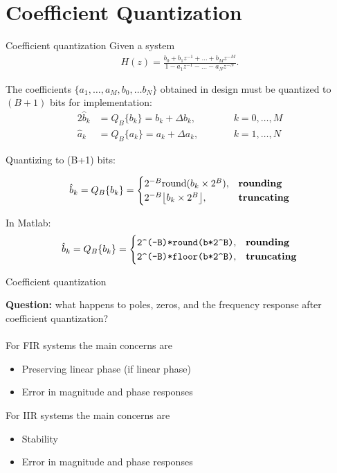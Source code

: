 \documentclass[10pt, aspectratio=169, handout]{beamer}
\begin{document}
%
\section{Coefficient Quantization}
\begin{frame}{Coefficient quantization}
	Given a system
	\begin{align*}
		H(z) = \frac{b_0 + b_1z^{-1} + \ldots + b_Mz^{-M}}{1 - a_1z^{-1} - \ldots - a_Nz^{-N}}.
	\end{align*}
	
	The coefficients $\{a_1, \ldots, a_M, b_0,\ldots b_N\}$ obtained in design must  be quantized to $(B+1)$ bits for implementation:
	\begin{alignat*}{2}
		\hat{b}_k &= Q_B\{b_k\} = b_k + \Delta b_k, \qquad &&  k = 0, \ldots, M \\
		\hat{a}_k &= Q_B\{a_k\} = a_k + \Delta a_k, \qquad && k = 1, \ldots, N
	\end{alignat*}
	
	\pause
	\vspace{0.25cm}
	Quantizing to (B+1) bits:
	
	\begin{equation*}
	\hat{b}_k = Q_B\{b_k\} = \begin{cases}
	2^{-B}\mathrm{round}(b_k\times 2^B), & \text{\textbf{rounding}} \\
	2^{-B}\big\lfloor b_k\times 2^B\big\rfloor, & \text{\textbf{truncating}}
	\end{cases}
	\end{equation*}
	
	In Matlab:
	\begin{equation*}
	\hat{b}_k = Q_B\{b_k\} = \begin{cases}
	\texttt{2\textasciicircum(-B)*round(b*2\textasciicircum B)}, & \text{\textbf{rounding}} \\
	\texttt{2\textasciicircum(-B)*floor(b*2\textasciicircum B)}, & \text{\textbf{truncating}}
	\end{cases}
	\end{equation*}
\end{frame}

\begin{frame}{Coefficient quantization}

\textbf{Question:} what happens to poles, zeros, and the frequency response after coefficient quantization?
~\\
~\\

For FIR systems the main concerns are
\begin{itemize}
	\item Preserving linear phase (if linear phase)
	\item Error in magnitude and phase responses
\end{itemize}

For IIR systems the main concerns are
\begin{itemize}
	\item Stability
	\item Error in magnitude and phase responses
\end{itemize}

\end{frame}
\end{document}
